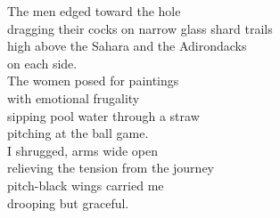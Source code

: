 The men edged toward the hole\\
dragging their cocks on narrow glass shard trails\\
high above the Sahara and the Adirondacks\\
on each side.\\

The women posed for paintings\\
with emotional frugality\\
sipping pool water through a straw\\
pitching at the ball game.\\

I shrugged, arms wide open\\
relieving the tension from the journey\\
pitch-black wings carried me\\
drooping but graceful.\\

